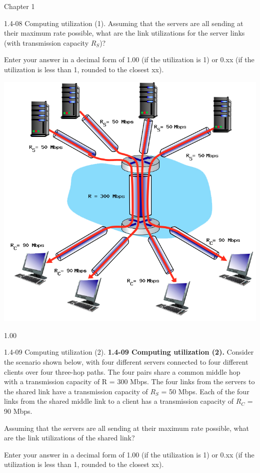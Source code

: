 \documentclass[a4paper]{article}
\begin{document}
\begin{quiz}{Chapter 1}
\begin{shortanswer}[points=1,shuffle=true]{1.4-08 Computing utilization (1).}
Assuming that the servers are all sending at their maximum rate possible, what are the link utilizations for the server links (with transmission capacity $R_S$)? 

Enter your answer in a decimal form of 1.00 (if the utilization is 1) or 0.xx (if the utilization is less than 1, rounded to the closest xx). 

\begin{center}
\includegraphics[width=.7\linewidth]{figs/1.4.7.png}
\end{center}
\item 1.00
\end{shortanswer}

\begin{shortanswer}[points=1,shuffle=true]{1.4-09 Computing utilization (2).}
\textbf{1.4-09 Computing utilization (2).} 
Consider the scenario shown below, with four different servers connected to four different clients over four three-hop paths. The four pairs share a common middle hop with a transmission capacity of R = 300 Mbps. The four links from the servers to the shared link have a transmission capacity of $R_S$ = 50 Mbps. Each of the four links from the shared middle link to a client has a transmission capacity of $R_C$ = 90 Mbps. 

Assuming that the servers are all sending at their maximum rate possible, what are the link utilizations of the shared link? 

Enter your answer in a decimal form of 1.00 (if the utilization is 1) or 0.xx (if the utilization is less than 1, rounded to the closest xx). 


\end{shortanswer}
\end{quiz}
\end{document}
